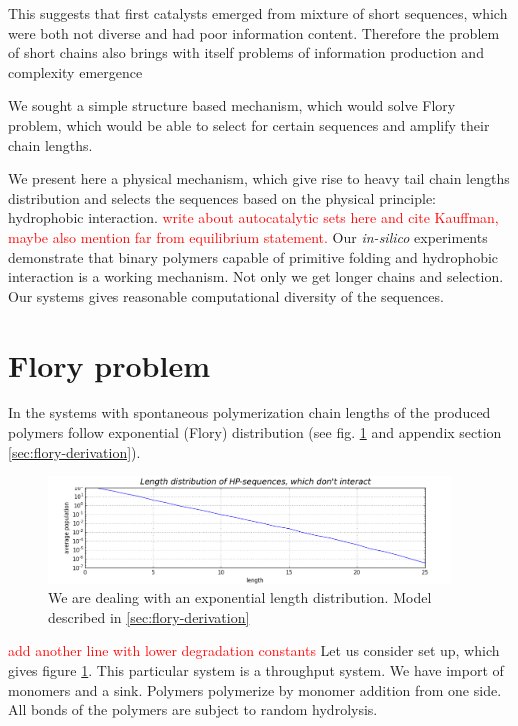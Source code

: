 \documentclass[12pt]{paper}
\newcommand{\red}[1]{\textcolor{red}{#1}}
\begin{document}
This suggests that first catalysts emerged from mixture of short sequences, which were both 
not diverse and had poor information content. Therefore the problem of short chains also brings 
with itself problems of information production and complexity emergence \cite{Joyce1987,Abel2005}

 We sought a simple structure based mechanism, 
which would solve Flory problem, which would be able to select for certain sequences and 
amplify their chain lengths.

 We present here a physical mechanism, which give rise to 
heavy tail chain lengths distribution and selects the sequences based on the physical principle: 
hydrophobic interaction. 
\red{write about autocatalytic sets here and cite Kauffman, maybe also mention far from 
equilibrium statement.}
Our \textit{in-silico} experiments demonstrate that binary polymers 
capable of primitive folding and hydrophobic interaction is a working mechanism. Not only we get 
longer chains and selection. Our systems gives reasonable computational diversity of the sequences.


   
\section{Flory problem}\label{sec:flory}
In the systems with spontaneous polymerization chain lengths of the produced polymers follow 
exponential (Flory) distribution (see fig. \ref{fig:flory} and appendix section 
\ref{sec:flory-derivation}).

\begin{figure}[h!]
  \centering
  \includegraphics[width=0.95\textwidth]{pictures/flory.png} 
  \caption{We are dealing with an exponential length distribution. 
    Model described in \ref{sec:flory-derivation}}
  \label{fig:flory}
\end{figure}
\red{add another line with lower degradation constants}
Let us consider set up, which gives figure \ref{fig:flory}. 
This particular system is a throughput system. We have import of monomers and a sink. Polymers 
polymerize by monomer addition from one side. All bonds of the polymers are subject to random 
hydrolysis.
\end{document}

